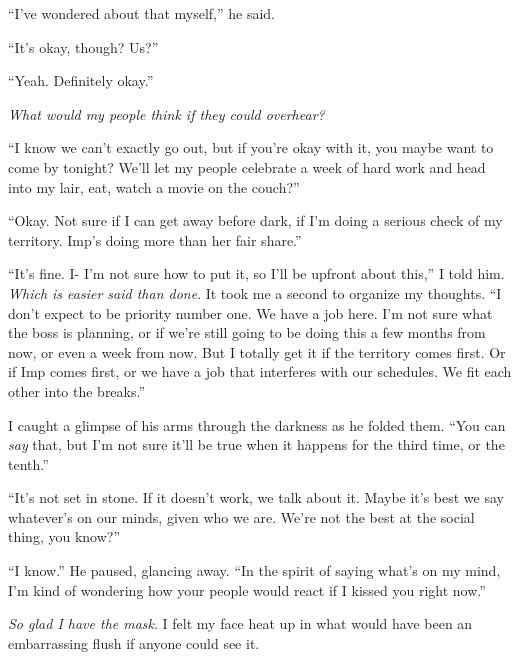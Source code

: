 ``I've wondered about that myself,'' he said.



``It's okay, though?  Us?''



``Yeah.  Definitely okay.''



\emph{What would my people think if they could overhear?}



``I know we can't exactly go out, but if you're okay with it, you maybe want to come by tonight?  We'll let my people celebrate a week of hard work and head into my lair, eat, watch a movie on the couch?''



``Okay.  Not sure if I can get away before dark, if I'm doing a serious check of my territory.  Imp's doing more than her fair share.''



``It's fine.  I- I'm not sure how to put it, so I'll be upfront about this,'' I told him.  \emph{Which is easier said than done}.  It took me a second to organize my thoughts.  ``I don't expect to be priority number one.  We have a job here.  I'm not sure what the boss is planning, or if we're still going to be doing this a few months from now, or even a week from now.  But I totally get it if the territory comes first.  Or if Imp comes first, or we have a job that interferes with our schedules.  We fit each other into the breaks.''



I caught a glimpse of his arms through the darkness as he folded them.  ``You can \emph{say} that, but I'm not sure it'll be true when it happens for the third time, or the tenth.''



``It's not set in stone.  If it doesn't work, we talk about it.  Maybe it's best we say whatever's on our minds, given who we are.  We're not the best at the social thing, you know?''



``I know.''  He paused, glancing away.  ``In the spirit of saying what's on my mind, I'm kind of wondering how your people would react if I kissed you right now.''



\emph{So glad I have the mask}.  I felt my face heat up in what would have been an embarrassing flush if anyone could see it.



